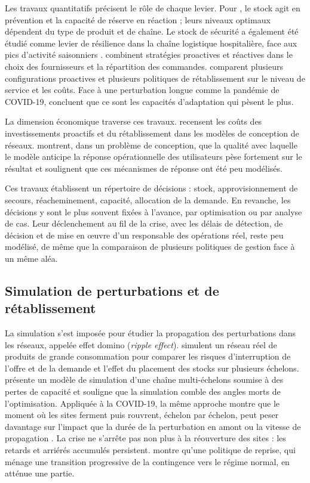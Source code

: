 Les travaux quantitatifs précisent le rôle de chaque levier. Pour \citet{lucker2019}, le stock agit en prévention et la capacité de réserve en réaction ; leurs niveaux optimaux dépendent du type de produit et de chaîne. Le stock de sécurité a également été étudié comme levier de résilience dans la chaîne logistique hospitalière, face aux pics d'activité saisonniers \citep{rahiel2025esd}. \citet{hosseini2019ijpe} combinent stratégies proactives et réactives dans le choix des fournisseurs et la répartition des commandes. \citet{ivanov2016tre} comparent plusieurs configurations proactives et plusieurs politiques de rétablissement sur le niveau de service et les coûts. Face à une perturbation longue comme la pandémie de COVID-19, \citet{ivanovdolgui2021ijpe} concluent que ce sont les capacités d'adaptation qui pèsent le plus.

La dimension économique traverse ces travaux. \citet{aldrighetti2021} recensent les coûts des investissements proactifs et du rétablissement dans les modèles de conception de réseaux. \citet{klibi2012ijpe} montrent, dans un problème de conception, que la qualité avec laquelle le modèle anticipe la réponse opérationnelle des utilisateurs pèse fortement sur le résultat et soulignent que ces mécanismes de réponse ont été peu modélisés.

Ces travaux établissent un répertoire de décisions : stock, approvisionnement de secours, réacheminement, capacité, allocation de la demande. En revanche, les décisions y sont le plus souvent fixées à l'avance, par optimisation ou par analyse de cas. Leur déclenchement au fil de la crise, avec les délais de détection, de décision et de mise en œuvre d'un responsable des opérations réel, reste peu modélisé, de même que la comparaison de plusieurs politiques de gestion face à un même aléa.

\subsection{Simulation de perturbations et de rétablissement}
\label{sec:ea-simulation}

La simulation s'est imposée pour étudier la propagation des perturbations dans les réseaux, appelée effet domino (\textit{ripple effect}). \citet{schmitt2012} simulent un réseau réel de produits de grande consommation pour comparer les risques d'interruption de l'offre et de la demande et l'effet du placement des stocks sur plusieurs échelons. \citet{ivanov2017} présente un modèle de simulation d'une chaîne multi-échelons soumise à des pertes de capacité et souligne que la simulation comble des angles morts de l'optimisation. Appliquée à la COVID-19, la même approche montre que le moment où les sites ferment puis rouvrent, échelon par échelon, peut peser davantage sur l'impact que la durée de la perturbation en amont ou la vitesse de propagation \citep{ivanov2020}. La crise ne s'arrête pas non plus à la réouverture des sites : les retards et arriérés accumulés persistent. \citet{ivanov2019cie} montre qu'une politique de reprise, qui ménage une transition progressive de la contingence vers le régime normal, en atténue une partie.

